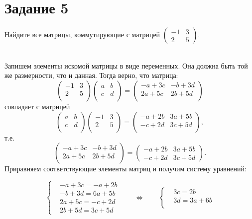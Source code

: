 \documentclass[a4paper,12pt]{article}
\begin{document}
\section*{Задание 5}
Найдите все матрицы, коммутирующие с матрицей
$\begin{pmatrix}
-1 & 3\\
2 & 5
\end{pmatrix}.$
\par
{}\\ Запишем элементы искомой матрицы в виде переменных. Она должна быть той же размерности, что и данная. Тогда верно, что матрица:
$$\begin{pmatrix}
-1 & 3\\
2 & 5 \\
\end{pmatrix}
\begin{pmatrix}
a & b\\
c & d \\
\end{pmatrix}
 =
\begin{pmatrix}
-a + 3c & -b+3d \\
2a + 5c & 2b+5d \\
\end{pmatrix}
$$
совпадает с матрицей
$$ \begin{pmatrix}
a & b\\
c & d \\
\end{pmatrix}
\begin{pmatrix}
-1 & 3\\
2 & 5 \\
\end{pmatrix}
 =
\begin{pmatrix}
-a + 2b & 3a+5b \\
-c + 2d & 3c+5d \\
\end{pmatrix},
$$
т.е.
$$
\begin{pmatrix}
-a + 3c & -b+3d \\
2a + 5c & 2b+5d \\
\end{pmatrix} = 
\begin{pmatrix}
-a + 2b & 3a+5b \\
-c + 2d & 3c+5d
\end{pmatrix}.$$
Приравняем соответствующие элементы матриц и получим систему уравнений: \par
$$\left\{
\begin{aligned}
&-a+3c = -a +2b\\
&-b+3d=6a+5b\\
&2a+5c=-c+2d\\
&2b+5d=3c+5d
\end{aligned}
\right.
\qquad
\Leftrightarrow
\qquad 
\left\{
\begin{aligned}
& 3c = 2b\\
&3d=3a+6b\\
\end{aligned}
\right.
$$
\end{document}
